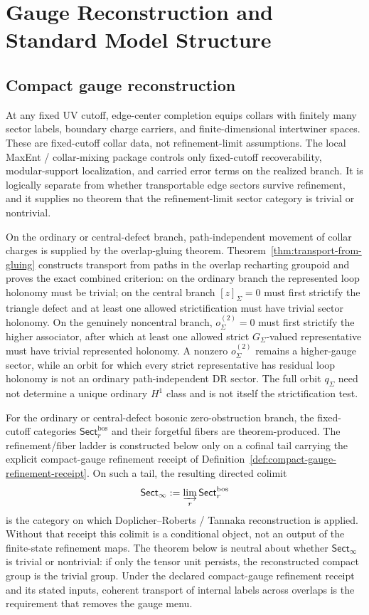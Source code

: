 \documentclass[11pt]{article}
\begin{document}
\section{Gauge Reconstruction and Standard Model Structure}

\subsection{Compact gauge reconstruction}

At any fixed UV cutoff, edge-center completion equips collars with finitely many sector labels, boundary charge carriers, and finite-dimensional intertwiner spaces. These are fixed-cutoff collar data, not refinement-limit assumptions. The local MaxEnt / collar-mixing package controls only fixed-cutoff recoverability, modular-support localization, and carried error terms on the realized branch. It is logically separate from whether transportable edge sectors survive refinement, and it supplies no theorem that the refinement-limit sector category is trivial or nontrivial.

On the ordinary or central-defect branch, path-independent movement of collar charges is supplied by the overlap-gluing theorem. Theorem~\ref{thm:transport-from-gluing} constructs transport from paths in the overlap recharting groupoid and proves the exact combined criterion: on the ordinary branch the represented loop holonomy must be trivial; on the central branch \([z]_\Sigma=0\) must first strictify the triangle defect and at least one allowed strictification must have trivial sector holonomy. On the genuinely noncentral branch, \(o^{(2)}_\Sigma=0\) must first strictify the higher associator, after which at least one allowed strict \(G_\Sigma\)-valued representative must have trivial represented holonomy. A nonzero \(o^{(2)}_\Sigma\) remains a higher-gauge sector, while an orbit for which every strict representative has residual loop holonomy is not an ordinary path-independent DR sector. The full orbit \(q_\Sigma\) need not determine a unique ordinary \(H^1\) class and is not itself the strictification test.

For the ordinary or central-defect bosonic zero-obstruction branch, the fixed-cutoff categories
\(\mathsf{Sect}^{\mathrm{bos}}_r\) and their forgetful fibers are theorem-produced. The
refinement/fiber ladder is constructed below only on a cofinal tail carrying the explicit
compact-gauge refinement receipt of Definition~\ref{def:compact-gauge-refinement-receipt}. On
such a tail, the resulting directed colimit
\[
\mathsf{Sect}_\infty := \varinjlim_r \mathsf{Sect}^{\mathrm{bos}}_r
\]
is the category on which Doplicher--Roberts / Tannaka reconstruction is applied. Without that
receipt this colimit is a conditional object, not an output of the finite-state refinement maps.
The theorem below is neutral about whether \(\mathsf{Sect}_\infty\) is trivial or nontrivial: if
only the tensor unit persists, the reconstructed compact group is the trivial group.
Under the declared compact-gauge refinement receipt and its stated inputs,
coherent transport of internal labels across overlaps is the requirement that
removes the gauge menu.
\end{document}
